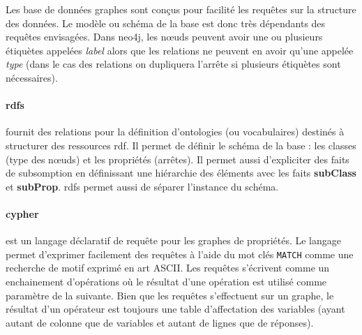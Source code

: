 Les base de données graphes sont conçus pour facilité les requêtes sur la structure des données.
Le modèle ou schéma de la base est donc très dépendants des requêtes envisagées.
Dans \gls{neo4j}, les nœuds peuvent avoir une ou plusieurs étiquètes appelées \textit{label} alors que les relations ne peuvent en avoir qu'une appelée \textit{type} (dans le cas des relations on dupliquera l'arrête si plusieurs étiquètes sont nécessaires).

\paragraph{\gls{rdfs}}
fournit des relations pour la définition d'ontologies (ou vocabulaires) destinés à structurer des ressources \gls{rdf}.
Il permet de définir le schéma de la base : les classes (type des nœuds) et les propriétés (arrêtes).
Il permet aussi d'expliciter des faits de subsomption en définissant une hiérarchie des éléments avec les faits \textbf{subClass} et \textbf{subProp}.
\gls{rdfs} permet aussi de séparer l'instance du schéma.

\paragraph{\gls{cypher}}
est un langage déclaratif de requête pour les graphes de propriétés.
Le langage permet d'exprimer facilement des requêtes à l'aide du mot clés \verb|MATCH| comme une recherche de motif exprimé en art ASCII.
Les requêtes s'écrivent comme un enchainement d'opérations où le résultat d'une opération est utilisé comme paramètre de la suivante.
Bien que les requêtes s'effectuent sur un graphe, le résultat d'un opérateur est toujours une table d'affectation des variables (ayant autant de colonne que de variables et autant de lignes que de réponses).
